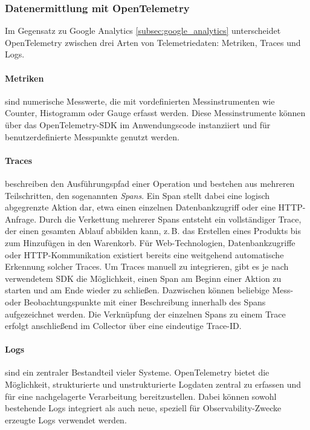 \subsubsection{Datenermittlung mit OpenTelemetry}
Im Gegensatz zu Google Analytics \ref{subsec:google_analytics} unterscheidet OpenTelemetry zwischen drei Arten von Telemetriedaten: Metriken, Traces und Logs.

\paragraph{Metriken} sind numerische Messwerte, die mit vordefinierten Messinstrumenten wie Counter, Histogramm oder Gauge erfasst werden. Diese Messinstrumente können über das OpenTelemetry-SDK im Anwendungscode instanziiert und für benutzerdefinierte Messpunkte genutzt werden.

\paragraph{Traces} beschreiben den Ausführungspfad einer Operation und bestehen aus mehreren Teilschritten, den sogenannten \emph{Spans}. Ein Span stellt dabei eine logisch abgegrenzte Aktion dar, etwa einen einzelnen Datenbankzugriff oder eine HTTP-Anfrage. Durch die Verkettung mehrerer Spans entsteht ein vollständiger Trace, der einen gesamten Ablauf abbilden kann, z.\,B. das Erstellen eines Produkts bis zum Hinzufügen in den Warenkorb.  
Für Web-Technologien, Datenbankzugriffe oder HTTP-Kommunikation existiert bereits eine weitgehend automatische Erkennung solcher Traces. Um Traces manuell zu integrieren, gibt es je nach verwendetem SDK die Möglichkeit, einen Span am Beginn einer Aktion zu starten und am Ende wieder zu schließen. Dazwischen können beliebige Mess- oder Beobachtungspunkte mit einer Beschreibung innerhalb des Spans aufgezeichnet werden. Die Verknüpfung der einzelnen Spans zu einem Trace erfolgt anschließend im Collector über eine eindeutige Trace-ID.

\paragraph{Logs} sind ein zentraler Bestandteil vieler Systeme. OpenTelemetry bietet die Möglichkeit, strukturierte und unstrukturierte Logdaten zentral zu erfassen und für eine nachgelagerte Verarbeitung bereitzustellen. Dabei können sowohl bestehende Logs integriert als auch neue, speziell für Observability-Zwecke erzeugte Logs verwendet werden.

